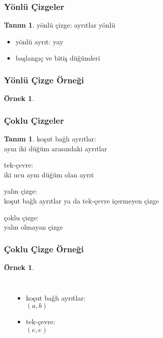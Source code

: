\documentclass[dvipsnames]{beamer}
\theoremstyle{definition}
\newtheorem{tanim}[theorem]{Tanım}
\theoremstyle{example}
\newtheorem{ornek}[theorem]{Örnek}
\theoremstyle{plain}
\begin{document}
\begin{frame}
  \frametitle{Yönlü Çizgeler}

  \begin{tanim}
    \alert{yönlü çizge}: ayrıtlar yönlü

    \pause
    \begin{itemize}
      \item yönlü ayrıt: \alert{yay}
      \item \alert{başlangıç} ve \alert{bitiş} düğümleri
    \end{itemize}
  \end{tanim}
\end{frame}

\begin{frame}
  \frametitle{Yönlü Çizge Örneği}

  \begin{ornek}
    \begin{center}
    \end{center}
  \end{ornek}
\end{frame}

\begin{frame}
  \frametitle{Çoklu Çizgeler}

  \begin{tanim}
    \alert{koşut bağlı ayrıtlar}:\\
    aynı iki düğüm arasındaki ayrıtlar

    \pause
    \bigskip
    \alert{tek-çevre}:\\
    iki ucu aynı düğüm olan ayrıt

    \pause
    \bigskip
    \alert{yalın çizge}:\\
    koşut bağlı ayrıtlar ya da tek-çevre içermeyen çizge

    \pause
    \bigskip
    \alert{çoklu çizge}:\\
    yalın olmayan çizge
  \end{tanim}
\end{frame}

\begin{frame}
  \frametitle{Çoklu Çizge Örneği}

  \begin{ornek}
    \begin{columns}
      \begin{center}
      \end{center}

      \begin{itemize}
        \item koşut bağlı ayrıtlar:\\
          $(a,b)$
        \item tek-çevre:\\
          $(e,e)$
      \end{itemize}
    \end{columns}
  \end{ornek}
\end{frame}
\end{document}
